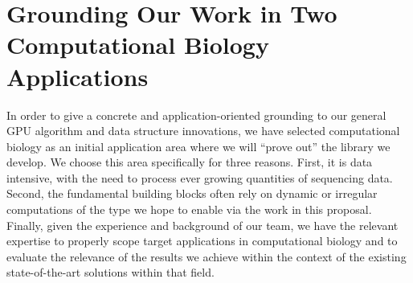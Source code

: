 


\section{Grounding Our Work in Two Computational Biology Applications}
\label{sec:compbio}


In order to give a concrete and application-oriented grounding to our general GPU algorithm and data structure innovations, we have selected computational biology as an initial application area where we will ``prove out'' the library we develop.  We choose this area specifically for three reasons. First, it is data intensive, with the need to process ever growing quantities of sequencing data. Second, the fundamental building blocks often rely on dynamic or irregular computations of the type we hope to enable via the work in this proposal. Finally, given the experience and background of our team, we have the relevant expertise to properly scope target applications in computational biology and to evaluate the relevance of the results we achieve within the context of the existing state-of-the-art solutions within that field.

